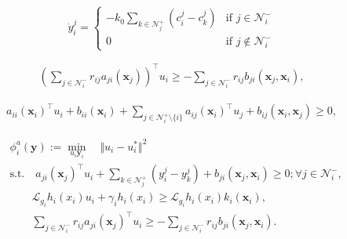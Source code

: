\documentclass[10pt,a4paper]{amsart}
\begin{document}
\begin{equation} \label{eq:y_updates}
    \dot{y}_i^j = 
    \begin{cases}
        -k_0 \sum_{k \in \mathcal{N}_j^+} (c_i^j - c_k^j) & \text{if } j \in \mathcal{N}_i^- \\
        0 & \text{if } j \notin \mathcal{N}_i^-
    \end{cases}
\end{equation}

\begin{equation} \label{eq:hams_rule_lin_eq}
    \begin{aligned}
       \left( \sum_{j \in \mathcal{N}_i^-} r_{ij}  a_{ji}(\mathbf{x}_j)  \right)^\top u_i 
        \geq  - \sum_{j \in \mathcal{N}_i^-} r_{ij} b_{ji}(\mathbf{x}_j,\mathbf{x}_i),
    \end{aligned}   
\end{equation}

\begin{equation}\label{eq:safe_cond_separated}
    \begin{aligned}
        a_{ii}(\mathbf{x}_i)^\top u_i + b_{ii}(\mathbf{x}_i) + \sum_{j \in \mathcal{N}_i^+ \setminus \{i\}} a_{ij}(\mathbf{x}_i)^\top u_j  +  b_{ij}(\mathbf{x}_i,\mathbf{x}_j) \geq 0,
    \end{aligned}
\end{equation}

\begin{align}
    &\phi_i^a(\mathbf{y}) := \min_{u_i \mathbf{y}_i} \quad \Vert u_i - u_{i}^* \Vert^2 \nonumber \\
    & \text{s.t.}  \quad a_{ji}(\mathbf{x}_j)^\top u_i  + \sum_{k \in \mathcal{N}_j^+} (y_i^j - y_k^j) +  b_{ji}(\mathbf{x}_j,\mathbf{x}_i) \geq 0
     ;\forall j \in \mathcal{N}_i^-, \nonumber\\
     & \quad  \quad
     \mathcal{L}_{g_i}h_i(x_i) u_i +  \gamma_i h_i(x_i) \geq \mathcal{L}_{g_i}h_i(x_i) k_i(\mathbf{x}_i), \nonumber \\
     & \quad  \quad
    \sum_{j \in \mathcal{N}_i^-} r_{ij}  a_{ji}(\mathbf{x}_j)^\top u_i 
    \geq  - \sum_{j \in \mathcal{N}_i^-} r_{ij} b_{ji}(\mathbf{x}_j,\mathbf{x}_i). \label{eq:prob_statement_distr_alt}
\end{align}
\end{document}
